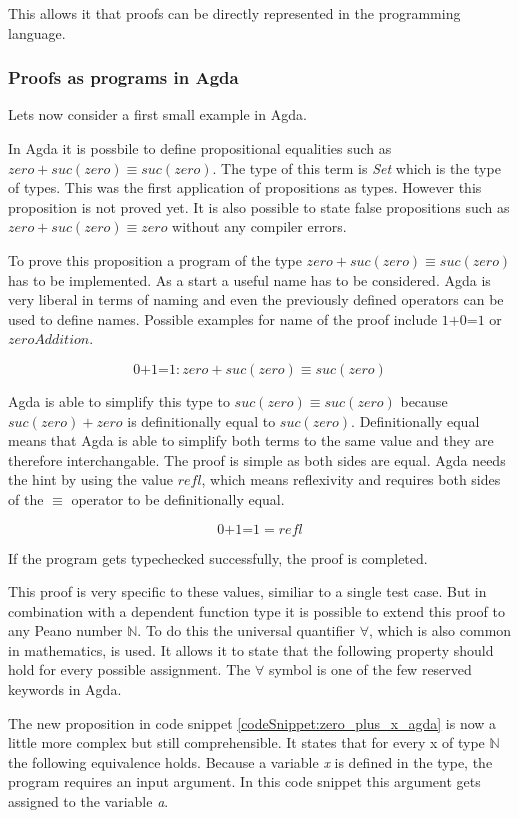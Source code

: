 This allows it that proofs can be directly represented in the programming language.

\subsubsection{Proofs as programs in Agda}
Lets now consider a first small example in Agda.

In Agda it is possbile to define propositional equalities such as $zero + suc(zero) \equiv suc(zero)$. The type of this term is \emph{Set} which is the type of types.
This was the first application of propositions as types.
However this proposition is not proved yet. It is also possible to state false propositions such as $zero + suc(zero) \equiv zero$ without any compiler errors.

To prove this proposition a program of the type $zero + suc(zero) \equiv suc(zero)$ has to be implemented.
As a start a useful name has to be considered. Agda is very liberal in terms of naming and even the previously defined operators can be used to define names. Possible examples for name of the proof include $\text{1+0=1}$ or $zeroAddition$.

$$\text{0+1=1} : zero + suc(zero) \equiv suc(zero)$$

Agda is able to simplify this type to $suc(zero) \equiv suc(zero)$ because $suc(zero) + zero$ is definitionally equal to $suc(zero)$. Definitionally equal means that Agda is able to simplify both terms to the same value and they are therefore interchangable.
The proof is simple as both sides are equal. 
Agda needs the hint by using the value $refl$, which means reflexivity and requires both sides of the $\equiv$ operator to be definitionally equal.

$$\text{0+1=1} = refl$$

If the program gets typechecked successfully, the proof is completed.

This proof is very specific to these values, similiar to a single test case.
But in combination with a dependent function type it is possible to extend this proof to any Peano number $\mathbb{N}$. 
To do this the universal quantifier $\forall$, which is also common in mathematics, is used.
It allows it to state that the following property should hold for every possible assignment\cite{plfa2019}.
The $\forall$ symbol is one of the few reserved keywords in Agda.

The new proposition in code snippet \ref{codeSnippet:zero_plus_x_agda} is now a little more complex but still comprehensible. 
It states that for every x of type $\mathbb{N}$ the following equivalence holds. 
Because a variable \emph{x} is defined in the type, the program requires an input argument.
In this code snippet this argument gets assigned to the variable \emph{a}.

